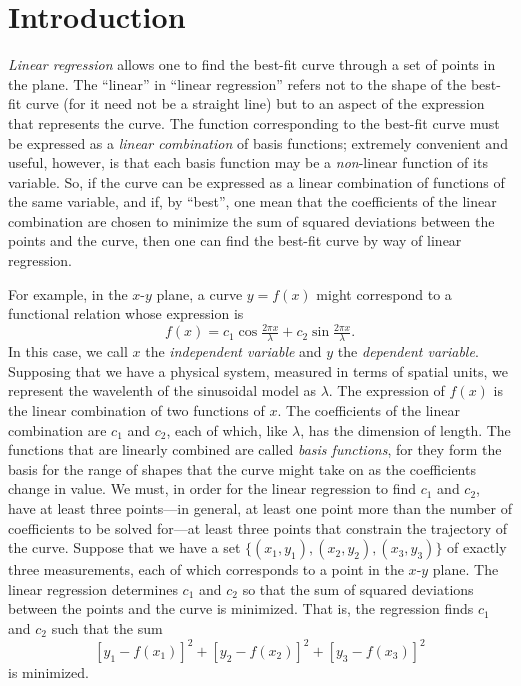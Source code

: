\documentclass[twocolumn]{article}
\begin{document}
\thispagestyle{fancy}

%
%

\section{Introduction}

\emph{Linear regression} allows one to find the best-fit curve through a set of
points in the plane. The ``linear'' in ``linear regression'' refers not to the
shape of the best-fit curve (for it need not be a straight line) but to an
aspect of the expression that represents the curve. The function corresponding
to the best-fit curve must be expressed as a \emph{linear combination} of basis
functions; extremely convenient and useful, however, is that each basis
function may be a \emph{non}-linear function of its variable.  So, if the curve
can be expressed as a linear combination of functions of the same variable, and
if, by ``best'', one mean that the coefficients of the linear combination are
chosen to minimize the sum of squared deviations between the points and the
curve, then one can find the best-fit curve by way of linear regression.

For example, in the $x$-$y$ plane, a curve $y = f(x)$ might correspond to a
functional relation whose expression is
\begin{equation}
   f(x) = c_1 \cos\tfrac{2\pi x}{\lambda} + c_2 \sin\tfrac{2\pi x}{\lambda}.
\end{equation}
In this case, we call $x$ the \emph{independent variable} and $y$ the
\emph{dependent variable}. Supposing that we have a physical system, measured
in terms of spatial units, we represent the wavelenth of the sinusoidal model
as $\lambda$.  The expression of $f(x)$ is the linear combination of two
functions of $x$. The coefficients of the linear combination are $c_1$ and
$c_2$, each of which, like $\lambda$, has the dimension of length. The
functions that are linearly combined are called \emph{basis functions}, for
they form the basis for the range of shapes that the curve might take on as the
coefficients change in value.  We must, in order for the linear regression to
find $c_1$ and $c_2$, have at least three points---in general, at least one
point more than the number of coefficients to be solved for---at least three
points that constrain the trajectory of the curve.  Suppose that we have a set
$\{(x_1, y_1), (x_2, y_2), (x_3, y_3)\}$ of exactly three measurements, each of
which corresponds to a point in the $x$-$y$ plane.  The linear regression
determines $c_1$ and $c_2$ so that the sum of squared deviations between the
points and the curve is minimized.  That is, the regression finds $c_1$ and
$c_2$ such that the sum
\begin{equation}
   \left[y_1 - f(x_1)\right]^2 + \left[y_2 - f(x_2)\right]^2 + \left[y_3 -
   f(x_3)\right]^2
\end{equation}
is minimized.
\end{document}
